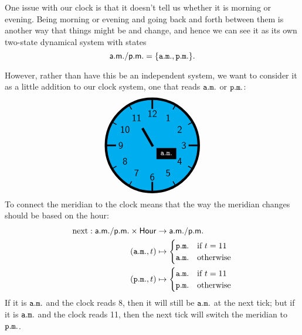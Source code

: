 \documentclass[DynamicalBook]{subfiles}
\begin{document}
One issue with our clock is that it doesn't tell us whether it is morning or
evening. Being morning or evening and going back and forth between them is another way that things might be and change, and hence we
can see it as its own two-state dynamical system with states
$$\mathsf{a.m./p.m.} = \{\mathtt{a.m.}, \mathtt{p.m.}\}.$$

However, rather than have this be an independent system, we want to consider it as a little addition to
our clock system, one that reads $\mathtt{a.m.}$ or $\mathtt{p.m.}$:
\begin{equation}\label{eqn.whole_clock}
\begin{tikzpicture}[line cap=rect,line width=3pt, baseline=(bl)]
\coordinate (bl) at (0,0);
\filldraw [fill=cyan] (0,0) circle [radius=2cm];
\foreach \angle [count=\xi] in {60,30,...,-270}
{
  \draw[line width=1pt] (\angle:1.8cm) -- (\angle:2cm);
  \node[font=\large] at (\angle:1.36cm) {\textsf{\xi}};
}
\foreach \angle in {0,90,180,270}
  \draw[line width=2pt] (\angle:1.6cm) -- (\angle:2cm);
\draw (0,0) -- (120:0.8cm);
\node[draw, fill] at (330:.7cm) {\small${ \color{white}\const{a.m.} }$};
\end{tikzpicture}
\end{equation}
To connect the meridian to the clock means that the way the meridian changes should be based on the hour:
\begin{align}\label{eqn.next}
  \mathrm{next} : \mathsf{a.m./p.m.} \times \mathsf{Hour} &\to \mathsf{a.m./p.m.} \\\nonumber
               (\mathtt{a.m.}, t) &\mapsto \begin{cases} \mathtt{p.m.} &\mbox{if $t = 11$}\\ \mathtt{a.m.} &\mbox{otherwise}  \end{cases} \\\nonumber
               (\mathtt{p.m.}, t) &\mapsto \begin{cases} \mathtt{a.m.} &\mbox{if $t = 11$}\\ \mathtt{p.m.} &\mbox{otherwise}  \end{cases}
\end{align}
If it is $\mathtt{a.m.}$ and the clock reads 8, then it will still be
$\mathtt{a.m.}$ at the next tick; but if it is $\mathtt{a.m.}$ and the clock reads 11, then the next tick will switch the meridian to $\mathtt{p.m.}$.
\end{document}
